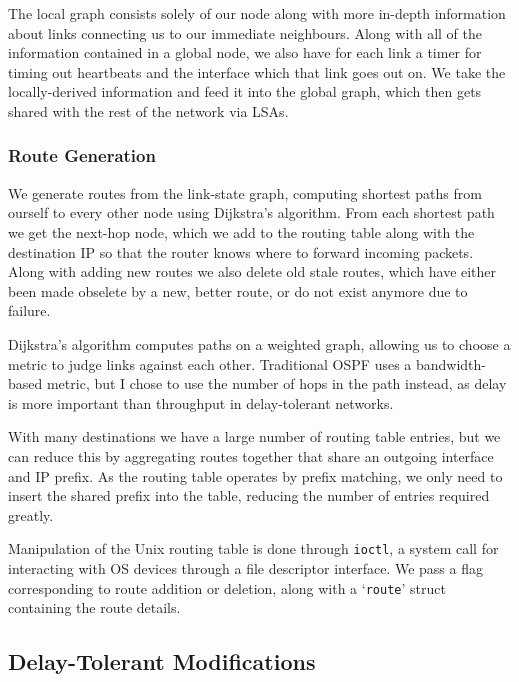 \documentclass[10pt,twoside,a4paper]{article}
\begin{document}
The local graph consists solely of our node along with more in-depth information about links connecting us to our immediate neighbours. Along with all of the information contained in a global node, we also have for each link a timer for timing out heartbeats and the interface which that link goes out on. We take the locally-derived information and feed it into the global graph, which then gets shared with the rest of the network via LSAs.

\subsubsection{Route Generation}

We generate routes from the link-state graph, computing shortest paths from ourself to every other node using Dijkstra's algorithm. From each shortest path we get the next-hop node, which we add to the routing table along with the destination IP so that the router knows where to forward incoming packets. Along with adding new routes we also delete old stale routes, which have either been made obselete by a new, better route, or do not exist anymore due to failure.

Dijkstra's algorithm computes paths on a weighted graph, allowing us to choose a metric to judge links against each other. Traditional OSPF uses a bandwidth-based metric, but I chose to use the number of hops in the path instead, as delay is more important than throughput in delay-tolerant networks.

With many destinations we have a large number of routing table entries, but we can reduce this by aggregating routes together that share an outgoing interface and IP prefix. As the routing table operates by prefix matching, we only need to insert the shared prefix into the table, reducing the number of entries required greatly.


Manipulation of the Unix routing table is done through
\texttt{ioctl}, a system call for interacting with OS devices through a file descriptor interface. We pass a flag corresponding to route addition or deletion, along with a `\texttt{route}' struct containing the route details.

\subsection{Delay-Tolerant Modifications}
\end{document}
